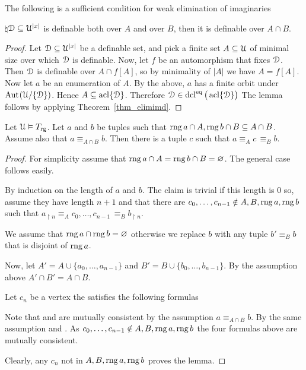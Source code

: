 \documentclass[creche.tex]{subfiles}
\begin{document}
\begin{lemma}\label{lem_suff_wei}
  The following is a sufficient condition for weak elimination of imaginaries

  $\natural$\qquad $\EuScript D\subseteq\EuScript U^{|x|}$ is definable both over $A$ and over $B$, then it is definable over $A\cap B$.
\end{lemma}

\begin{proof}
  Let $\EuScript D\subseteq\EuScript U^{|x|}$ be a definable set, and pick a finite set $A\subseteq\EuScript U$ of minimal size over which $\EuScript D$ is definable. 
  Now, let $f$ be an automorphism that fixes $\EuScript D$. Then $\EuScript D$ is definable over $A\cap f[A]$, so by minimality of $|A|$ we have $A= f[A]$. 
  Now let $a$ be an enumeration of $A$.
  By the above, $a$ has a finite orbit under ${\rm Aut\kern.15ex}(\EuScript U/\{\EuScript D\})$.
  Hence $A\subseteq\mathop{\rm acl}\{\EuScript D\}$.
  Therefore $\EuScript D\in\mathop{\rm dcl}^{{\rm eq}}\big(\mathop{\rm acl}\{\EuScript D\}\big)$
  The lemma follows by applying Theorem~\ref{thm_elimimd}.
\end{proof}

\begin{lemma}\label{lem_type_amalgamation}
  Let $\EuScript U\vDash T_{\rm rg}$.
  Let $a$ and $b$ be tuples such that $\mathop{\rm rng} a\cap A,\mathop{\rm rng} b\cap B\subseteq A\cap B$.
  Assume also that $a\equiv_{A\cap B}b$.
  Then there is a tuple $c$ such that $a\equiv_A c\,\equiv_B b$.
\end{lemma}

\begin{proof}
  For simplicity assume that $\mathop{\rm rng} a\cap A=\mathop{\rm rng} b\cap B=\varnothing$.
  The general case follows easily.

  By induction on the length of $a$ and $b$. 
  The claim is trivial if this length is $0$ so, assume they have length $n+1$ and that there are $c_0,\dots,c_{n-1}\notin A, B,\mathop{\rm rng} a,\mathop{\rm rng} b$ such that $a_{\restriction n}\equiv_A c_0,\dots,c_{n-1}\,\equiv_B b_{\restriction n}$.

  We assume that $\mathop{\rm rng} a\cap\mathop{\rm rng} b=\varnothing$ otherwise we replace $b$ with any tuple $b'\equiv_Bb$ that is disjoint of $\mathop{\rm rng} a$.

  Now, let $A'=A\cup\{a_0,\dots,a_{n-1}\}$ and $B'=B\cup\{b_0,\dots,b_{n-1}\}$.
  By the assumption above $A'\cap B'=A\cap B$.

  Let $c_n$ be a vertex the satisfies the following formulas





  Note that  and  are mutually consistent by the assumption $a\equiv_{A\cap B}b$.
  By the same assumption  and .
  As $c_0,\dots,c_{n-1}\notin A, B,\mathop{\rm rng} a,\mathop{\rm rng} b$ the four formulas above are mutually consistent.

  Clearly, any $c_n$ not in $A, B,\mathop{\rm rng} a,\mathop{\rm rng} b$ proves the lemma.
\end{proof}
\end{document}
